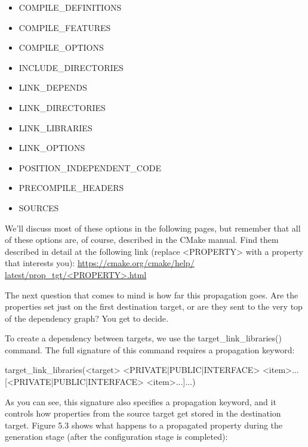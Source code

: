 \begin{itemize}
\item
COMPILE\_DEFINITIONS

\item
COMPILE\_FEATURES

\item
COMPILE\_OPTIONS

\item
INCLUDE\_DIRECTORIES

\item
LINK\_DEPENDS

\item
LINK\_DIRECTORIES

\item
LINK\_LIBRARIES

\item
LINK\_OPTIONS

\item
POSITION\_INDEPENDENT\_CODE

\item
PRECOMPILE\_HEADERS

\item
SOURCES
\end{itemize}

We’ll discuss most of these options in the following pages, but remember that all of these options are, of course, described in the CMake manual. Find them described in detail at the following link (replace <PROPERTY> with a property that interests you): \url{https://cmake.org/cmake/help/ latest/prop_tgt/<PROPERTY>.html}

The next question that comes to mind is how far this propagation goes. Are the properties set just on the first destination target, or are they sent to the very top of the dependency graph? You get to decide.

To create a dependency between targets, we use the target\_link\_libraries() command. The full signature of this command requires a propagation keyword:

\begin{shell}
target_link_libraries(<target>
                    <PRIVATE|PUBLIC|INTERFACE> <item>...
                    [<PRIVATE|PUBLIC|INTERFACE> <item>...]...)
\end{shell}

As you can see, this signature also specifies a propagation keyword, and it controls how properties from the source target get stored in the destination target. Figure 5.3 shows what happens to a propagated property during the generation stage (after the configuration stage is completed):

